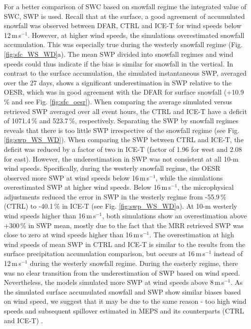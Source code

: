 \documentclass{ametsocV5}
\begin{document}
        For a better comparison of SWC based on snowfall regime the integrated value of SWC, SWP is used. Recall that at the surface, a good agreement of accumulated snowfall was observed between DFAR, CTRL and ICE-T for wind speeds below 12\,m\,s$^{-1}$. However, at higher wind speeds, the simulations overestimated snowfall accumulation. This was especially true during the westerly snowfall regime (Fig. \ref{fig:sfc_WS_WD}a). The mean SWP divided into snowfall regimes and wind speeds could thus indicate if the bias is similar for snowfall in the vertical. In contrast to the surface accumulation, the simulated instantaneous SWP, averaged over the 27 days, shows a significant underestimation in SWP relative to the OESR, which was in good agreement with the DFAR for surface snowfall (+10.9\,\% and see Fig. \ref{fig:sfc_oesr}). When comparing the average simulated versus retrieved SWP averaged over all event hours, the CTRL and ICE-T have a deficit of 1071.4\,\% and 523.7\,\%, respectively. Separating the SWP by snowfall regimes reveals that there is too little SWP irrespective of the snowfall regime (see Fig. \ref{fig:swp_WS_WD}). When comparing the SWP between CTRL and ICE-T, the deficit was reduced by a factor of two in ICE-T (factor of 1.96 for west and 2.08 for east). However, the underestimation in SWP was not consistent at all 10-m wind speeds. Specifically, during the westerly snowfall regime, the OESR observed more SWP at wind speeds below 16\,m\,s$^{-1}$, while the simulations overestimated SWP at higher wind speeds. Below 16\,m\,s$^{-1}$, the microphysical adjustments reduced the error in SWP in the westerly regime from -55.9\,\% (CTRL) to -40.1\,\% in ICE-T (see Fig. \ref{fig:swp_WS_WD}a). At 10-m westerly wind speeds higher than 16\,m\,s$^{-1}$, both simulations show an overestimation above +300\,\% in SWP mean, mostly due to the fact that the MRR retrieved SWP was close to zero at wind speeds higher than 16\,m\,s$^{-1}$. The overestimation at high wind speeds of mean SWP in CTRL and ICE-T is similar to the results from the surface precipitation accumulation comparison, but occurs at 16\,m\,s$^{-1}$ instead of 12\,m\,s$^{-1}$ during the westerly snowfall regime. During the easterly regime, there was no clear transition from the underestimation of SWP based on wind speed. Nevertheless, the models simulated more SWP at wind speeds above 8\,m\,s$^{-1}$. As the simulated surface accumulated snowfall and SWP show similar biases based on wind speed, we suggest that it may be due to the same reason - too high wind speeds and subsequent spillover estimated in MEPS and its counterparts (CTRL and ICE-T) \citep{muller_arome-metcoop:_2017,frogner_convection-permitting_2019}. 
        
\end{document}
